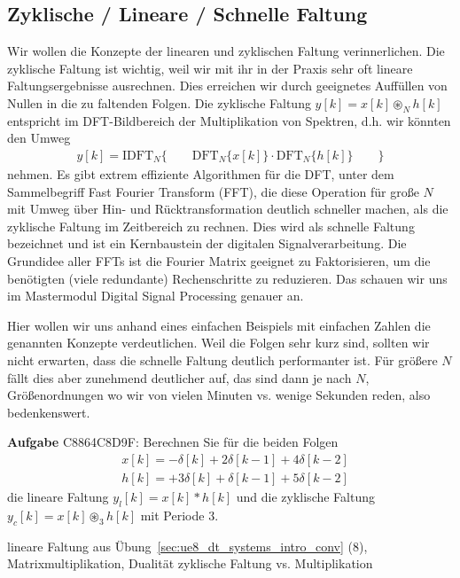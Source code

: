 \clearpage
\subsection{Zyklische / Lineare / Schnelle Faltung}
\label{sec:C8864C8D9F}
\begin{Ziel}
Wir wollen die Konzepte der linearen und zyklischen Faltung verinnerlichen.
Die zyklische Faltung ist wichtig, weil wir mit ihr in der Praxis sehr
oft lineare Faltungsergebnisse ausrechnen. Dies erreichen wir
durch geeignetes Auffüllen von Nullen in die zu faltenden Folgen.
Die zyklische Faltung $y[k] = x[k]\circledast_N h[k]$
entspricht im DFT-Bildbereich der Multiplikation von Spektren, d.h. wir könnten
den Umweg
\begin{align}
y[k] = \mathrm{IDFT}_N\{\qquad\mathrm{DFT}_N\{x[k]\} \cdot \mathrm{DFT}_N\{h[k]\}\qquad\}
\end{align}
nehmen. Es gibt extrem effiziente Algorithmen für die DFT,
unter dem Sammelbegriff Fast Fourier Transform (FFT), die diese Operation für
große $N$ mit Umweg über Hin- und Rücktransformation deutlich schneller machen,
als die zyklische Faltung im Zeitbereich zu rechnen. Dies wird als schnelle
Faltung bezeichnet und ist ein Kernbaustein der digitalen Signalverarbeitung.
Die Grundidee aller FFTs ist die Fourier Matrix geeignet zu Faktorisieren, um
die benötigten (viele redundante) Rechenschritte zu reduzieren. Das schauen
wir uns im Mastermodul Digital Signal Processing genauer an.

Hier wollen wir uns anhand eines einfachen Beispiels mit einfachen Zahlen die
genannten Konzepte verdeutlichen. Weil die Folgen sehr kurz sind, sollten wir
nicht erwarten, dass die schnelle Faltung deutlich performanter ist.
Für größere $N$ fällt dies aber zunehmend deutlicher auf, das sind dann je nach $N$,
Größenordnungen wo wir von vielen Minuten vs. wenige Sekunden reden, also bedenkenswert.
\end{Ziel}
\textbf{Aufgabe} {\tiny C8864C8D9F}:
Berechnen Sie für die beiden Folgen
\begin{align}
&x[k] = -\delta[k] +2 \delta[k-1] + 4 \delta[k-2]\\
&h[k] = +3 \delta[k] + \delta[k-1] + 5 \delta[k-2]
\end{align}
die lineare Faltung $y_l[k] = x[k] \ast h[k]$ und die zyklische Faltung
$y_c[k] = x[k] \circledast_3 h[k]$
mit Periode $3$.
\begin{Werkzeug}
lineare Faltung aus Übung~\ref{sec:ue8_dt_systems_intro_conv} (8),
Matrixmultiplikation, Dualität zyklische Faltung
vs. Multiplikation
\end{Werkzeug}
